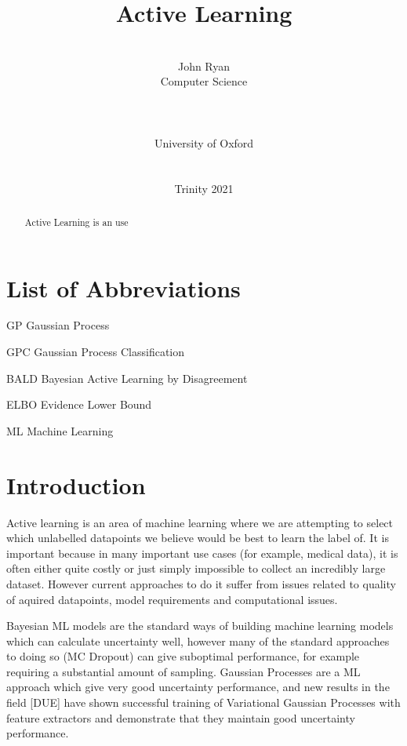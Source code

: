 \documentclass[12pt, a4paper]{report}
\date{}
\title{Active Learning}
\author{\\ \Large{John Ryan}
\\ Computer Science
\\
\\
\\
\\ University of Oxford
\\
\\ \\
Trinity 2021
}
\theoremstyle{definition}
\begin{document}

\thispagestyle{headings}
	\maketitle
\FloatBarrier
{}


\thispagestyle{empty}
\begin{abstract}

Active Learning is an use

\end{abstract}
\tableofcontents
\thispagestyle{plain}
\listoffigures
\listoftables
\listofalgocfs
\listoftheorems

\chapter*{List of Abbreviations}
\begin{abbreviations}
    \item[GP] Gaussian Process
    \item[GPC] Gaussian Process Classification
    \item[BALD] Bayesian Active Learning by Disagreement
    \item[ELBO] Evidence Lower Bound
    \item[ML] Machine Learning
\end{abbreviations}

\chapter{Introduction}

Active learning is an area of machine learning where we are attempting to select which unlabelled datapoints we believe would be best to learn the label of. It is important because in many important use cases (for example, medical data), it is often either quite costly or just simply impossible to collect an incredibly large dataset. However current approaches to do it suffer from issues related to quality of aquired datapoints, model requirements and computational issues.

Bayesian ML models are the standard ways of building machine learning models which can calculate uncertainty well, however many of the standard approaches to doing so (MC Dropout) can give suboptimal performance, for example requiring a substantial amount of sampling. Gaussian Processes are a ML approach which give very good uncertainty performance, and new results in the field [DUE] have shown successful training of Variational Gaussian Processes with feature extractors and demonstrate that they maintain good uncertainty performance.
\end{document}
